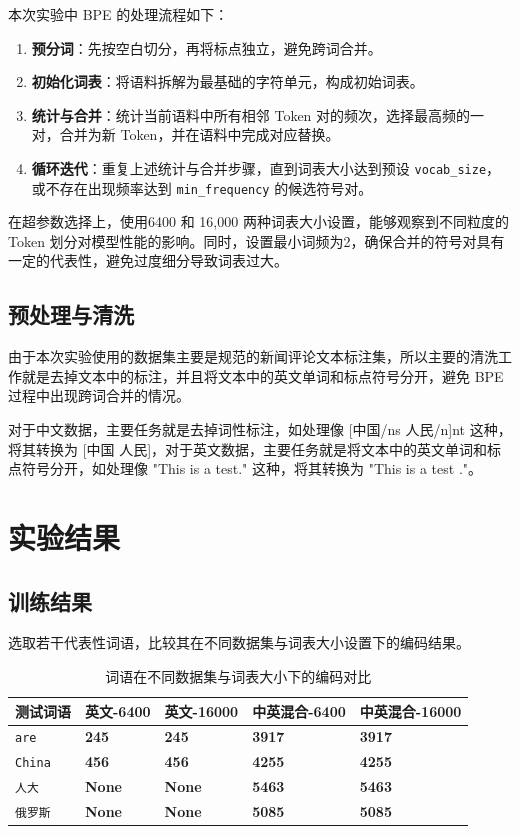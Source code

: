\documentclass[a4paper,12pt]{ctexart} %
\begin{document}
本次实验中 BPE 的处理流程如下：
\begin{enumerate}
    \item \textbf{预分词}：先按空白切分，再将标点独立，避免跨词合并。
    \item \textbf{初始化词表}：将语料拆解为最基础的字符单元，构成初始词表。
    \item \textbf{统计与合并}：统计当前语料中所有相邻 Token 对的频次，选择最高频的一对，合并为新 Token，并在语料中完成对应替换。
    \item \textbf{循环迭代}：重复上述统计与合并步骤，直到词表大小达到预设 \texttt{vocab\_size}，或不存在出现频率达到 \texttt{min\_frequency} 的候选符号对。
\end{enumerate}
在超参数选择上，使用6400 和 16,000 两种词表大小设置，能够观察到不同粒度的 Token 划分对模型性能的影响。同时，设置最小词频为2，确保合并的符号对具有一定的代表性，避免过度细分导致词表过大。
\subsection{预处理与清洗}
由于本次实验使用的数据集主要是规范的新闻评论文本标注集，所以主要的清洗工作就是去掉文本中的标注，并且将文本中的英文单词和标点符号分开，避免 BPE 过程中出现跨词合并的情况。


对于中文数据，主要任务就是去掉词性标注，如处理像 [中国/ns 人民/n]nt 这种，将其转换为 [中国 人民]，对于英文数据，主要任务就是将文本中的英文单词和标点符号分开，如处理像 "This is a test." 这种，将其转换为 "This is a test ."。

\section{实验结果}


\subsection{训练结果}
选取若干代表性词语，比较其在不同数据集与词表大小设置下的编码结果。

\begin{table}[H]
    \centering
    \begin{tabular}{p{} p{} p{} p{} p{}}
        \toprule
        测试词语 & 英文-6400 & 英文-16000 & 中英混合-6400 & 中英混合-16000 \\
        \midrule
        \texttt{are} & \textbf{245} & \textbf{245} & \textbf{3917} & \textbf{3917} \\
        \texttt{China} & \textbf{456} & \textbf{456} & \textbf{4255} & \textbf{4255} \\
        \texttt{人大} & \textbf{None} & \textbf{None} & \textbf{5463} & \textbf{5463} \\
        \texttt{俄罗斯} & \textbf{None} & \textbf{None} & \textbf{5085} & \textbf{5085} \\
        \bottomrule
    \end{tabular}
    \caption{词语在不同数据集与词表大小下的编码对比}
\end{table}
\end{document}
